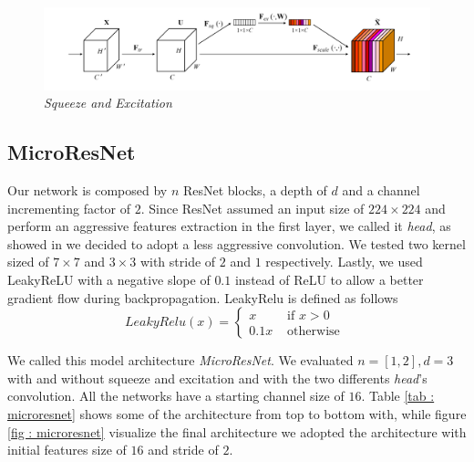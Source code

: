 \documentclass[../document.tex]{subfiles}
\begin{document}
\begin{figure}[htbp]
    \centering
    \includegraphics[width=\linewidth]{../img/implementation/estimator/se.png}
    \caption{\emph{Squeeze and Excitation} \cite{hu2017squeeze}}
\end{figure}
\subsection{MicroResNet}
Our network is composed by $n$ ResNet blocks, a depth of $d$ and a channel incrementing factor of $2$. Since ResNet assumed an input size of $224\times224$ and perform an aggressive features extraction in the first layer, we called it \emph{head}, as showed in  we decided to adopt a less aggressive convolution. We tested two kernel sized of $7\times7$ and $3\times3$ with stride of $2$ and $1$ respectively. Lastly, we used LeakyReLU \cite{leakyrelu} with a negative slope of $0.1$ instead of ReLU to allow a better gradient flow during backpropagation. LeakyRelu is defined as follows
\begin{equation}
LeakyRelu(x)=\left\{\begin{array}{ll}{x} & {\text { if } x>0} \\ {0.1 x} & {\text { otherwise }}\end{array}\right.
\end{equation}

We called this model architecture \emph{MicroResNet}. We evaluated $n=[1,2], d=3$ with and without squeeze and excitation and with the two differents \emph{head}'s convolution. All the networks have a starting channel size of $16$. Table \ref{tab : microresnet} shows some of the architecture from top to bottom with, while figure \ref{fig : microresnet} visualize the final architecture we adopted  the architecture with initial features size of $16$ and stride of $2$. 
\end{document}
